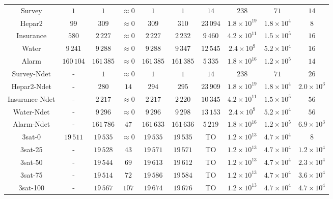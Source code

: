\begin{table}
\begin{adjustbox}{max width=\textwidth}
\begin{tabu}{c | c | ccc | c | c | c c c}
		\midrule 
		Survey & $1$ & $1$ & $\approx 0$ & $1$ & $1$ & $14$ & $238$ & $71$ & $14$ \\
		Hepar2 & $99$ & $309$ & $\approx 0$ & $309$ & $310$ & $23\,094$ & $1.8 \times 10^{19} $ & $1.8 \times 10^4$ & $8$ \\
		Insurance & $580$ & $2\,227$ & $\approx 0$ & $2\,227$ & $2\,232$ & $9\,460$ & $4.2 \times 10^{11}$ & $1.5 \times 10^5$ & $16$ \\
		Water & $9\,241$ & $9\,288$ & $\approx 0$ & $9\,288$  & $9\,347$   & $12\,545$ & $2.4 \times 10^{9} $ & $5.2 \times 10^4$ & $16$ \\
		Alarm & $160\,104$ & $161\,385$ & $\approx 0$ & $161\,385$ & $161\,385$ & $5\,335$ & $1.8 \times 10^{16}$ & $1.2 \times 10^5$ & $14$ \\
		
		\midrule 
		Survey-Ndet & - & $1$ & $\approx 0$ & $1$ & $1$ & $14$ & $238$ & $71$ & $26$ \\
		Hepar2-Ndet & - & $280$ & $14$ & $294$ & $295$ & $23\,909$ & $1.8 \times 10^{19} $  & $1.8 \times 10^4$ & $2.0 \times 10^3$ \\
		Insurance-Ndet & - & $2\,217$ & $\approx 0$ & $2\,217$ & $2\,220$ & $10\,345$ & $4.2 \times 10^{11}$ & $1.5 \times 10^5$ & $56$ \\
		Water-Ndet & - & $9\,296$ & $\approx 0$ & $9\,296$ & $9\,298$ & $13\,153$ & $2.4 \times 10^{9} $ & $5.2 \times 10^4$ & $56$ \\
		Alarm-Ndet & - & $161\,786$ & $47$ & $161\,633$ & $161\,636$ & $5\,219$ & $1.8 \times 10^{16}$ & $1.2 \times 10^5$ & $6.9 \times 10^3$ \\
		
		
		\midrule
		3sat-0 & $19\,511$ & $19\,535$  & {$\approx 0$} & {$19\,535$} & {$19\,535$} & TO & $1.2 \times10^{13}$ & $4.7\times10^4$ & $8$ \\
		3sat-25 & - & $19\,528$ & {$43$} & {$19\,571$} & {$19\,571$} & TO & $1.2 \times10^{13}$ & $4.7\times10^4$ & $1.2\times10^4$ \\
		3sat-50 & - & $19\,544$ & {$69$} & {$19\,613$} & {$19\,612$} & TO & {$1.2 \times10^{13}$} & $4.7\times10^4$ & $2.3\times10^4$ \\
		3sat-75 & - & $19\,514$ & {$72$} & {$19\,586$} & {$19\,584$} & TO & {$1.2 \times10^{13}$} & $4.7\times10^4$ & $3.6\times10^4$ \\
		3sat-100 & - & $19\,567$ & {$107$} & {$19\,674$} & {$19\,676$} & TO & {$1.2 \times10^{13}$} & $4.7\times10^4$ & $4.7\times10^4$ \\
		\bottomrule
	\end{tabu}
	\end{adjustbox}
\end{table}

